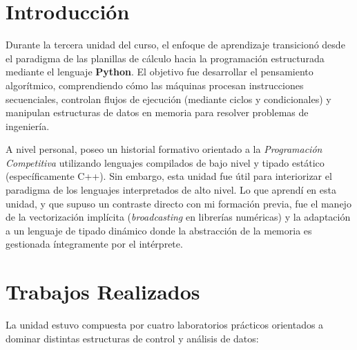 \section{Introducción}

Durante la tercera unidad del curso, el enfoque de aprendizaje transicionó desde el paradigma de las planillas de cálculo hacia la programación estructurada mediante el lenguaje \textbf{Python}. El objetivo fue desarrollar el pensamiento algorítmico, comprendiendo cómo las máquinas procesan instrucciones secuenciales, controlan flujos de ejecución (mediante ciclos y condicionales) y manipulan estructuras de datos en memoria para resolver problemas de ingeniería.

A nivel personal, poseo un historial formativo orientado a la \textit{Programación Competitiva} utilizando lenguajes compilados de bajo nivel y tipado estático (específicamente C++). Sin embargo, esta unidad fue útil para interiorizar el paradigma de los lenguajes interpretados de alto nivel. Lo que aprendí en esta unidad, y que supuso un contraste directo con mi formación previa, fue el manejo de la vectorización implícita (\textit{broadcasting} en librerías numéricas) y la adaptación a un lenguaje de tipado dinámico donde la abstracción de la memoria es gestionada íntegramente por el intérprete.

\section{Trabajos Realizados}

La unidad estuvo compuesta por cuatro laboratorios prácticos orientados a dominar distintas estructuras de control y análisis de datos:

